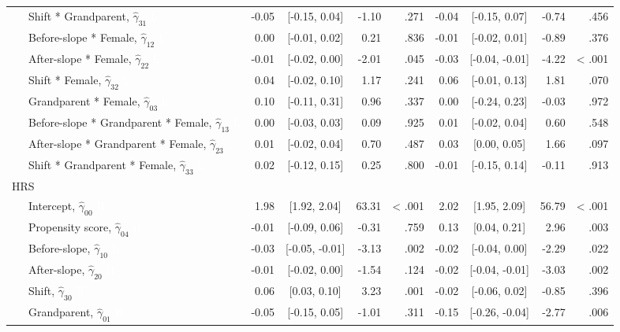 \documentclass[
  english,
  man, noextraspace,floatsintext]{apa7}
\newenvironment{lltable}{\begin{landscape}\begin{center}\begin{ThreePartTable}}{\end{ThreePartTable}\end{center}\end{landscape}}
\begin{document}
\begin{appendix}
\begin{lltable}
{\begin{longtable}{lrcrrrcrr}
\ \ \ Shift * Grandparent, $\hat{\gamma}_{31}$ \textcolor{white}{L} & -0.05 & {}[-0.15, 0.04] & -1.10 & .271 & -0.04 & {}[-0.15, 0.07] & -0.74 & .456\\
\ \ \ Before-slope * Female, $\hat{\gamma}_{12}$ \textcolor{white}{L} & 0.00 & {}[-0.01, 0.02] & 0.21 & .836 & -0.01 & {}[-0.02, 0.01] & -0.89 & .376\\
\ \ \ After-slope * Female, $\hat{\gamma}_{22}$ \textcolor{white}{L} & -0.01 & {}[-0.02, 0.00] & -2.01 & .045 & -0.03 & {}[-0.04, -0.01] & -4.22 & < .001\\
\ \ \ Shift * Female, $\hat{\gamma}_{32}$ \textcolor{white}{L} & 0.04 & {}[-0.02, 0.10] & 1.17 & .241 & 0.06 & {}[-0.01, 0.13] & 1.81 & .070\\
\ \ \ Grandparent * Female, $\hat{\gamma}_{03}$ \textcolor{white}{L} & 0.10 & {}[-0.11, 0.31] & 0.96 & .337 & 0.00 & {}[-0.24, 0.23] & -0.03 & .972\\
\ \ \ Before-slope * Grandparent * Female, $\hat{\gamma}_{13}$ \textcolor{white}{L} & 0.00 & {}[-0.03, 0.03] & 0.09 & .925 & 0.01 & {}[-0.02, 0.04] & 0.60 & .548\\
\ \ \ After-slope * Grandparent * Female, $\hat{\gamma}_{23}$ \textcolor{white}{L} & 0.01 & {}[-0.02, 0.04] & 0.70 & .487 & 0.03 & {}[0.00, 0.05] & 1.66 & .097\\
\ \ \ Shift * Grandparent * Female, $\hat{\gamma}_{33}$ \textcolor{white}{L} & 0.02 & {}[-0.12, 0.15] & 0.25 & .800 & -0.01 & {}[-0.15, 0.14] & -0.11 & .913\\
HRS &  &  &  &  &  &  &  & \\
\ \ \ Intercept, $\hat{\gamma}_{00}$ \textcolor{white}{H} & 1.98 & {}[1.92, 2.04] & 63.31 & < .001 & 2.02 & {}[1.95, 2.09] & 56.79 & < .001\\
\ \ \ Propensity score, $\hat{\gamma}_{04}$ \textcolor{white}{H} & -0.01 & {}[-0.09, 0.06] & -0.31 & .759 & 0.13 & {}[0.04, 0.21] & 2.96 & .003\\
\ \ \ Before-slope, $\hat{\gamma}_{10}$ \textcolor{white}{H} & -0.03 & {}[-0.05, -0.01] & -3.13 & .002 & -0.02 & {}[-0.04, 0.00] & -2.29 & .022\\
\ \ \ After-slope, $\hat{\gamma}_{20}$ \textcolor{white}{H} & -0.01 & {}[-0.02, 0.00] & -1.54 & .124 & -0.02 & {}[-0.04, -0.01] & -3.03 & .002\\
\ \ \ Shift, $\hat{\gamma}_{30}$ \textcolor{white}{H} & 0.06 & {}[0.03, 0.10] & 3.23 & .001 & -0.02 & {}[-0.06, 0.02] & -0.85 & .396\\
\ \ \ Grandparent, $\hat{\gamma}_{01}$ \textcolor{white}{H} & -0.05 & {}[-0.15, 0.05] & -1.01 & .311 & -0.15 & {}[-0.26, -0.04] & -2.77 & .006\\

\end{longtable}}
\end{lltable}
\end{appendix}
\end{document}
